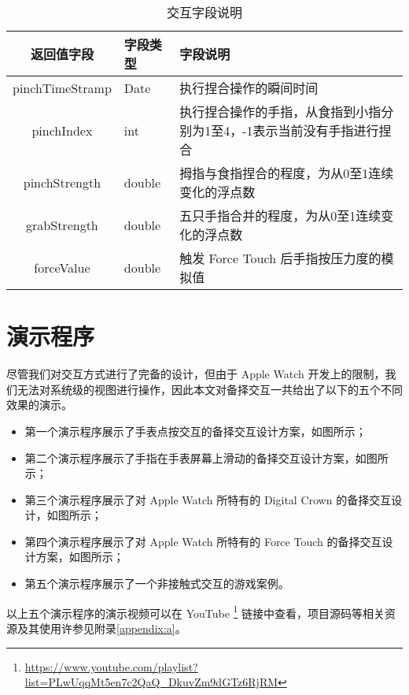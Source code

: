 \begin{table}[H]
    \small
    \kaishu
    \centering
    
    \caption{交互字段说明}

    \begin{tabular}{c l l}
        \toprule
        \textbf{返回值字段}        & \textbf{字段类型} & \textbf{字段说明} \\
        \hline
        pinchTimeStramp & Date  & 执行捏合操作的瞬间时间 \\
        pinchIndex     & int    & 执行捏合操作的手指，从食指到小指分别为1至4，-1表示当前没有手指进行捏合 \\
        pinchStrength  & double & 拇指与食指捏合的程度，为从0至1连续变化的浮点数 \\
        grabStrength   & double & 五只手指合并的程度，为从0至1连续变化的浮点数 \\
        forceValue     & double & 触发 Force Touch 后手指按压力度的模拟值\\
        \bottomrule
    \end{tabular}

    \label{table:server-feild}
\end{table}

\section{演示程序}

尽管我们对交互方式进行了完备的设计，但由于 Apple Watch 开发上的限制，我们无法对系统级的视图进行操作，因此本文对备择交互一共给出了以下的五个不同效果的演示。

\begin{itemize}
    \kaishu
    \item 第一个演示程序展示了手表点按交互的备择交互设计方案，如图所示；
    \item 第二个演示程序展示了手指在手表屏幕上滑动的备择交互设计方案，如图所示；
    \item 第三个演示程序展示了对 Apple Watch 所特有的 Digital Crown 的备择交互设计，如图所示；
    \item 第四个演示程序展示了对 Apple Watch 所特有的 Force Touch 的备择交互设计方案，如图所示；
    \item 第五个演示程序展示了一个非接触式交互的游戏案例。
\end{itemize}

以上五个演示程序的演示视频可以在 YouTube
\footnote{\url{https://www.youtube.com/playlist?list=PLwUqqMt5en7c2QaQ_DkuvZm9dGTz6RjRM}}
链接中查看，项目源码等相关资源及其使用许参见附录\ref{appendix:a}。

\cleardoublepage

